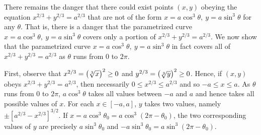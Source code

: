 There remains the danger that there could exist points $(x,y)$ obeying
 the equation $x^{2/3}+y^{2/3}=a^{2/3}$ that are not of the form
$x= a\cos^3\theta,\ y=a\sin^3\theta$ for any $\theta$. That is, there is a danger
that the parametrized curve $x= a\cos^3\theta,\ y=a\sin^3\theta$ covers only
a portion of $x^{2/3}+y^{2/3}=a^{2/3}$. We now show that 
the parametrized curve $x= a\cos^3\theta,\ y=a\sin^3\theta$ in fact covers all
of $x^{2/3}+y^{2/3}=a^{2/3}$ as $\theta$ runs from $0$ to $2\pi$.

First, observe that $x^{2/3}=\big(\root 3\of x\big)^2\ge 0$ and 
$y^{2/3}=\big(\root 3\of y\big)^2\ge 0$. Hence, if $(x,y)$ obeys
$x^{2/3}+y^{2/3}=a^{2/3}$, then necessarily $0\le x^{2/3}\le a^{2/3} $
and so $-a\le x\le a$. As $\theta$ runs from $0$ to $2\pi$, $a\cos^3\theta$
takes all values between $-a$ and $a$ and hence takes all possible values
of $x$. For each $x\in[-a,a]$, $y$ takes two values, namely $\pm{[a^{2/3}-x^{2/3}]}^{3/2}$.
If $x=a\cos^3\theta_0=a\cos^3(2\pi-\theta_0)$, the two corresponding values 
of $y$ are precisely
$a\sin^3\theta_0$ and $-a\sin^3\theta_0=a\sin^3(2\pi-\theta_0)$.

